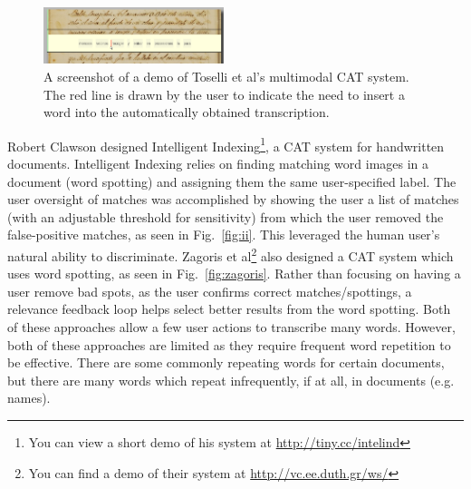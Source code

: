 \documentclass[conference]{IEEEtran}
\begin{document}
\begin{figure}
    \centering
    \includegraphics[width=0.47\textwidth]{Toselli_multimodalCAT}
    \caption{A screenshot of a demo of Toselli et al's multimodal CAT system. The red line is drawn by the user to indicate the need to insert a word into the automatically obtained transcription.}
    \label{fig:Toselli_multimodalCAT}
\end{figure}

Robert Clawson designed Intelligent Indexing\cite{Clawson2014}\footnote{You can view a short demo of his system at \url{http://tiny.cc/intelind}}, a CAT system for handwritten documents. Intelligent Indexing relies on finding matching word images in a document (word spotting) and assigning them the same user-specified label.
The user oversight of matches was accomplished by showing the user a list of matches (with an adjustable threshold for sensitivity) from which the user removed the false-positive matches, as seen in Fig.~\ref{fig:ii}. This leveraged the human user's natural ability to discriminate. Zagoris et al\cite{Zagoris2015}\footnote{You can find a demo of their system at \url{http://vc.ee.duth.gr/ws/}} also designed a CAT system which uses word spotting, as seen in Fig.~\ref{fig:zagoris}. Rather than focusing on having a user remove bad spots, as the user confirms correct matches/spottings, a relevance feedback loop helps select better results from the word spotting. Both of these approaches allow a few user actions to transcribe many words. However, both of these approaches are limited as they require frequent word repetition to be effective. There are some commonly repeating words for certain documents, but there are many words which repeat infrequently, if at all, in documents (e.g. names).
\end{document}
